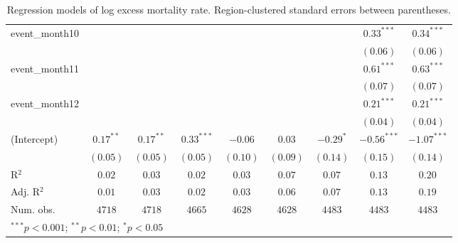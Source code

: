 \begin{table}
\begin{center}
\begin{tabular}{l c c c c c c c c}
event\_month10  &              &              &              &              &              &              & $0.33^{***}$  & $0.34^{***}$  \\
                &              &              &              &              &              &              & $(0.06)$      & $(0.06)$      \\
event\_month11  &              &              &              &              &              &              & $0.61^{***}$  & $0.63^{***}$  \\
                &              &              &              &              &              &              & $(0.07)$      & $(0.07)$      \\
event\_month12  &              &              &              &              &              &              & $0.21^{***}$  & $0.21^{***}$  \\
                &              &              &              &              &              &              & $(0.04)$      & $(0.04)$      \\
(Intercept)     & $0.17^{**}$  & $0.17^{**}$  & $0.33^{***}$ & $-0.06$      & $0.03$       & $-0.29^{*}$  & $-0.56^{***}$ & $-1.07^{***}$ \\
                & $(0.05)$     & $(0.05)$     & $(0.05)$     & $(0.10)$     & $(0.09)$     & $(0.14)$     & $(0.15)$      & $(0.14)$      \\
\hline
R$^2$           & $0.02$       & $0.03$       & $0.02$       & $0.03$       & $0.07$       & $0.07$       & $0.13$        & $0.20$        \\
Adj. R$^2$      & $0.01$       & $0.03$       & $0.02$       & $0.03$       & $0.06$       & $0.07$       & $0.13$        & $0.19$        \\
Num. obs.       & $4718$       & $4718$       & $4665$       & $4628$       & $4628$       & $4483$       & $4483$        & $4483$        \\
\hline
\multicolumn{9}{l}{\scriptsize{$^{***}p<0.001$; $^{**}p<0.01$; $^{*}p<0.05$}}
\end{tabular}
\caption{Regression models of log excess mortality rate. Region-clustered standard errors between parentheses.}
\label{tab:basemodels}
\end{center}
\end{table}
